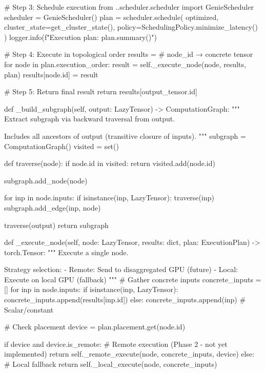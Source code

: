         # Step 3: Schedule execution
        from ..scheduler.scheduler import GenieScheduler
        scheduler = GenieScheduler()
        plan = scheduler.schedule(
            optimized,
            cluster_state=get_cluster_state(),
            policy=SchedulingPolicy.minimize_latency()
        )
        logger.info(f"Execution plan: {plan.summary()}")
        
        # Step 4: Execute in topological order
        results = {}  # node_id → concrete tensor
        for node in plan.execution_order:
            result = self._execute_node(node, results, plan)
            results[node.id] = result
        
        # Step 5: Return final result
        return results[output_tensor.id]
    
    def _build_subgraph(self, output: LazyTensor) -> ComputationGraph:
        """
        Extract subgraph via backward traversal from output.
        
        Includes all ancestors of output (transitive closure of inputs).
        """
        subgraph = ComputationGraph()
        visited = set()
        
        def traverse(node):
            if node.id in visited:
                return
            visited.add(node.id)
            
            subgraph.add_node(node)
            
            for inp in node.inputs:
                if isinstance(inp, LazyTensor):
                    traverse(inp)
                    subgraph.add_edge(inp, node)
        
        traverse(output)
        return subgraph
    
    def _execute_node(self, node: LazyTensor, results: dict,
                     plan: ExecutionPlan) -> torch.Tensor:
        """
        Execute a single node.
        
        Strategy selection:
        - Remote: Send to disaggregated GPU (future)
        - Local: Execute on local GPU (fallback)
        """
        # Gather concrete inputs
        concrete_inputs = []
        for inp in node.inputs:
            if isinstance(inp, LazyTensor):
                concrete_inputs.append(results[inp.id])
            else:
                concrete_inputs.append(inp)  # Scalar/constant
        
        # Check placement
        device = plan.placement.get(node.id)
        
        if device and device.is_remote:
            # Remote execution (Phase 2 - not yet implemented)
            return self._remote_execute(node, concrete_inputs, device)
        else:
            # Local fallback
            return self._local_execute(node, concrete_inputs)
    
